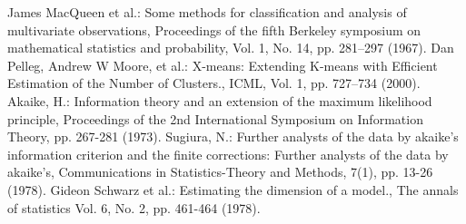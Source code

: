 \begin{thebibliography}{99}
    James MacQueen et al.:
    Some methods for classification and analysis of multivariate observations,
    Proceedings of the fifth Berkeley symposium on mathematical statistics and probability,
    Vol. 1, No. 14, pp. 281--297 (1967).
    Dan Pelleg, Andrew W Moore, et al.:
    X-means: Extending K-means with Efficient Estimation of the Number of Clusters.,
    ICML, Vol. 1, pp. 727--734 (2000).
    Akaike, H.: 
    Information theory and an extension of the maximum likelihood principle, 
    Proceedings of the 2nd International Symposium on Information Theory, 
    pp. 267-281 (1973).
    Sugiura, N.:
    Further analysts of the data by akaike's information criterion and the finite corrections:
    Further analysts of the data by akaike's, 
    Communications in Statistics-Theory and Methods, 7(1), pp. 13-26 (1978).
    Gideon Schwarz et al.:
    Estimating the dimension of a model.,
    The annals of statistics Vol. 6, No. 2, pp. 461-464 (1978).
\end{thebibliography}
